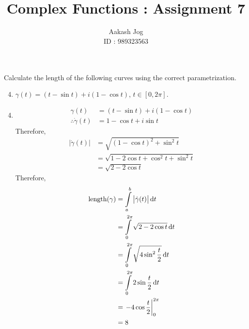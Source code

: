 \documentclass[fleqn, a4paper, 11pt, oneside]{amsart}
\title{Complex Functions : Assignment 7}
\author
{
	Aakash Jog\\
	ID : 989323563
}
\date{\formatdate{16}{12}{2015}}
\theoremstyle{definition}
\theoremstyle{theorem}
\DeclareMathOperator{\length}{length}
\begin{document}

\maketitle

\setcounter{question}{0}
\begin{question}
	Calculate the length of the following curves using the correct parametrization.
	\begin{enumerate}
		\setcounter{enumi}{3}
		\item $\gamma(t) = (t - \sin t) + i (1 - \cos t)$, $t \in [0,2 \pi]$.
	\end{enumerate}
\end{question}

\begin{solution}
	\begin{enumerate}[leftmargin=*]
		\setcounter{enumi}{3}
		\item
			\begin{align*}
				\gamma(t)                  & = (t - \sin t) + i (1 - \cos t) \\
				\therefore \dot{\gamma}(t) & = 1 - \cos t + i \sin t
			\end{align*}
			Therefore,
			\begin{align*}
				\left| \dot{\gamma}(t) \right| & = \sqrt{(1 - \cos t)^2 + \sin^2 t}          \\
                                                               & = \sqrt{1 - 2 \cos t + \cos^2 t + \sin^2 t} \\
                                                               & = \sqrt{2 - 2 \cos t}
			\end{align*}
			Therefore,
			\begin{align*}
				\length(\gamma) & = \int\limits_{a}^{b} \left| \dot{\gamma}(t) \right| \dif t  \\
                                                & = \int\limits_{0}^{2 \pi} \sqrt{2 - 2 \cos t} \dif t         \\
                                                & = \int\limits_{0}^{2 \pi} \sqrt{4 \sin^2 \frac{t}{2}} \dif t \\
                                                & = \int\limits_{0}^{2 \pi} 2 \sin \frac{t}{2} \dif t          \\
                                                & = \left. -4 \cos \frac{t}{2} \right|_{0}^{2 \pi}             \\
                                                & = 8
			\end{align*}
	\end{enumerate}
\end{solution}
\end{document}

